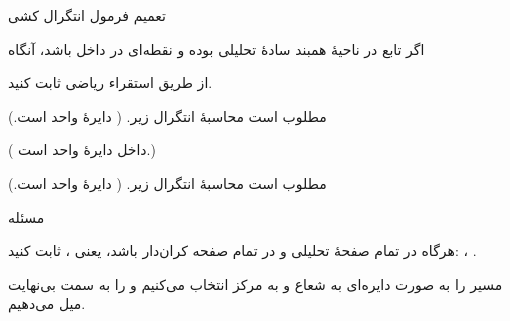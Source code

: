 \begin{EMtheorem}{تعمیم فرمول انتگرال کشی}

اگر تابع  در ناحیهٔ همبند سادهٔ  تحلیلی بوده و  نقطه‌ای در داخل  باشد، آنگاه

\end{EMtheorem}

\begin{EMexercise}{}

از طریق استقراء ریاضی ثابت کنید.

\end{EMexercise}

\begin{EMexample}{}

مطلوب است محاسبهٔ انتگرال زیر. ( دایرهٔ واحد است.)

( داخل دایرهٔ واحد است.)

\end{EMexample}

\begin{EMexample}{}

مطلوب است محاسبهٔ انتگرال زیر. ( دایرهٔ واحد است.)


\end{EMexample}

\begin{EMexercise}{مسئله}

هرگاه  در تمام صفحهٔ  تحلیلی و در تمام صفحه کران‌دار باشد، یعنی ، ثابت کنید: ، .

مسیر  را به صورت دایره‌ای به شعاع  و به مرکز  انتخاب می‌کنیم و  را به سمت بی‌نهایت میل می‌دهیم.

\end{EMexercise}

